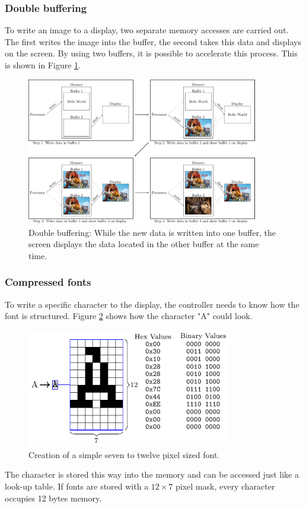 \subsubsection{Double buffering}
To write an image to a display, two separate memory accesses are carried out.
The first writes the image into the buffer, the second takes this data and displays on the screen.
By using two buffers, it is possible to accelerate this process.
This is shown in Figure \ref{theory:buffer}.

\begin{figure}[ht]
	\centering
	\includegraphics[width=0.9\textwidth]{2-theory/drawing-graphics/graphics/buffer.pdf}
	\caption{Double buffering: While the new data is written into one buffer, the screen displays the data located in the other buffer at the same time.\label{theory:buffer}}
\end{figure}

\subsubsection{Compressed fonts}\label{theory:CompressedFonts}
To write a specific character to the display, the controller needs to know how the font is structured.
Figure \ref{theory:font12} shows how the character "A" could look.
\begin{figure}[ht]
	\centering
	\includegraphics[width=0.8\textwidth]{2-theory/drawing-graphics/graphics/font12.pdf}
	\caption{Creation of a simple seven to twelve pixel sized font.\label{theory:font12}}
\end{figure}
The character is stored this way into the memory and can be accessed just like a look-up table.
If fonts are stored with a $12\times 7$ pixel mask, every character occupies 12 bytes memory.

